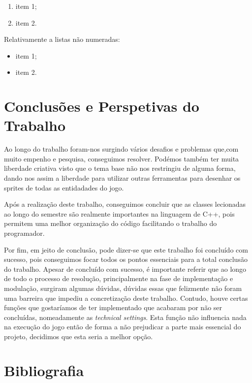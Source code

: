 \documentclass[a4paper,11pt]{article}
\newcommand\tabitem{\setlength{\itemindent}{1cm}}
\newcommand\tab[1][0.8cm]{\hspace*{#1}}
\begin{document}
\begin{enumerate}
    \tabitem
    \item item 1;
    \item item 2.
\end{enumerate}

Relativamente a listas não numeradas:

\begin{itemize}
    \tabitem
    \item item 1;
    \item item 2.
\end{itemize}

\pagebreak


\section{Conclusões e Perspetivas do Trabalho}

\tab Ao longo do trabalho foram-nos surgindo vários desafios e problemas que,com muito empenho e pesquisa, conseguimos resolver. Podémos também ter muita liberdade criativa visto que o tema base não nos restringiu de alguma forma, dando nos assim a liberdade para utilizar outras ferramentas para desenhar os sprites de todas as entidadades do jogo. \tab
    
Após a realização deste trabalho, conseguimos concluir que as classes lecionadas ao longo do semestre são realmente importantes na linguagem de C++, pois permitem uma melhor organização do código facilitando o trabalho do programador.\tab 

Por fim, em jeito de conclusão, pode dizer-se que este trabalho foi concluído com sucesso, pois conseguimos focar todos os pontos essenciais para a total conclusão do trabalho. Apesar de concluído com sucesso, é importante referir que ao longo de todo o processo de resolução, principalmente na fase de implementação e modulação, surgiram algumas dúvidas, dúvidas essas que felizmente não foram uma barreira que impediu a concretização deste trabalho. Contudo, houve certas funções que gostaríamos de ter implementado que acabaram por não ser concluídas, nomeadamente as \textit{technical settings}. Esta função não influencia nada na execução do jogo então de forma a não prejudicar a parte mais essencial do projeto, decidimos que esta seria a melhor opção.



\pagebreak






\printbibliography[title={Referências Bibliográficas}]


\pagebreak





\appendix

\section{Bibliografia}

\tab \Blindtext

\pagebreak
\end{document}
